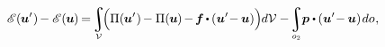 \nopagebreak\vspace{-0.25em}\begin{equation*}
\potentialenergyfunctional \hspace{.16ex} (\hspace{-0.1ex}\bm{u}'\hspace{.1ex}) \hspace{-0.2ex} -
\potentialenergyfunctional \hspace{.16ex} (\hspace{-0.1ex}\bm{u}\hspace{-0.1ex}) \hspace{-0.2ex}
= \hspace{-0.3ex}
\scalebox{0.9}{$\displaystyle\integral\displaylimits_{\mathcal{V}}$} \hspace{-0.44ex}
\Bigl(
\potential(\hspace{-0.1ex}\bm{u}'\hspace{.1ex}) \hspace{-0.2ex} - \potential(\hspace{-0.1ex}\bm{u}\hspace{-0.1ex}) \hspace{-0.2ex} - \hspace{-0.2ex} \bm{f} \hspace{-0.17ex} \dotp \hspace{-0.1ex} ( \bm{u}' \hspace{-0.4ex} - \hspace{-0.1ex} \bm{u} ) \Bigr) \hspace{-0.1ex} d\mathcal{V}
- \hspace{-0.3ex}
\scalebox{0.9}{$\displaystyle\integral\displaylimits_{o_2}$} \hspace{-0.1ex}
\bm{p} \dotp \hspace{-0.1ex} ( \bm{u}' \hspace{-0.4ex} - \hspace{-0.1ex} \bm{u} ) \hspace{.2ex} do
\hspace{.1ex} ,
\vspace{-0.1em}\end{equation*}

